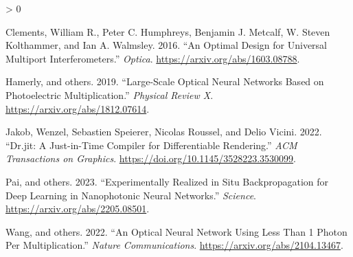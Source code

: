 \documentclass[
  10pt,
]{article}
\newlength{\cslhangindent}
\newenvironment{CSLReferences}[2] %
 {%
  \setlength{\parindent}{0pt}
  \ifodd #1 \everypar{\setlength{\hangindent}{\cslhangindent}}\ignorespaces\fi
  \ifnum #2 > 0
  \setlength{\parskip}{#2\baselineskip}
  \fi
 }%
 {}
\begin{document}
\hypertarget{refs}{}
\begin{CSLReferences}{1}{0}
\leavevmode{}%
Clements, William R., Peter C. Humphreys, Benjamin J. Metcalf, W. Steven
Kolthammer, and Ian A. Walmsley. 2016. {``An Optimal Design for
Universal Multiport Interferometers.''} \emph{Optica}.
\url{https://arxiv.org/abs/1603.08788}.

\leavevmode{}%
Hamerly, and others. 2019. {``Large-Scale Optical Neural Networks Based
on Photoelectric Multiplication.''} \emph{Physical Review X}.
\url{https://arxiv.org/abs/1812.07614}.

\leavevmode{}%
Jakob, Wenzel, Sebastien Speierer, Nicolas Roussel, and Delio Vicini.
2022. {``Dr.jit: A Just-in-Time Compiler for Differentiable
Rendering.''} \emph{ACM Transactions on Graphics}.
\url{https://doi.org/10.1145/3528223.3530099}.

\leavevmode{}%
Pai, and others. 2023. {``Experimentally Realized in Situ
Backpropagation for Deep Learning in Nanophotonic Neural Networks.''}
\emph{Science}. \url{https://arxiv.org/abs/2205.08501}.

\leavevmode{}%
Wang, and others. 2022. {``An Optical Neural Network Using Less Than 1
Photon Per Multiplication.''} \emph{Nature Communications}.
\url{https://arxiv.org/abs/2104.13467}.

\end{CSLReferences}
\end{document}
